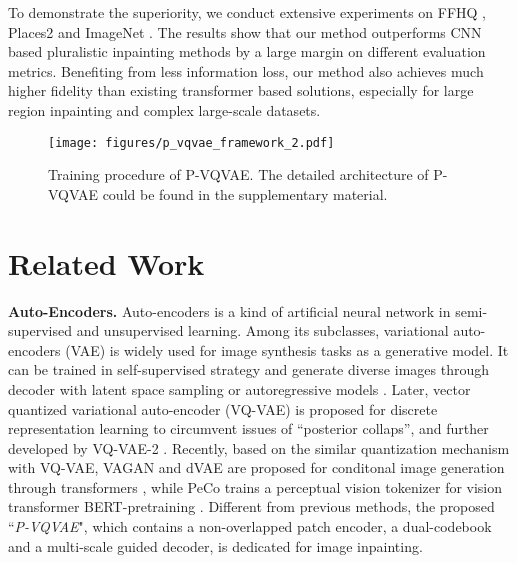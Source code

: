 \documentclass[10pt,twocolumn,letterpaper]{article}
\begin{document}
    To demonstrate the superiority, we conduct extensive experiments on FFHQ \cite{karras2019style}, Places2 \cite{zhou2017places} and ImageNet \cite{deng2009imagenet}. The results show that our method outperforms CNN based pluralistic inpainting methods by a large margin on different evaluation metrics. Benefiting from less information loss, our method also achieves much higher fidelity than existing transformer based solutions, especially for large region inpainting and complex large-scale datasets.


\begin{figure*}[t]
	\centering
	\texttt{[image: figures/p\_vqvae\_framework\_2.pdf]} 
	\caption{Training procedure of P-VQVAE. 
The detailed architecture of P-VQVAE could be found in the supplementary material.
	}
	\vspace{-8pt}
	\label{figure: p_vqvae_framework}
\end{figure*}
    
  
\section{Related Work}
\label{sec:related work}

\noindent\textbf{Auto-Encoders.}
Auto-encoders \cite{hinton1994autoencoders} is a kind of artificial neural network in semi-supervised and unsupervised learning. Among its subclasses, variational auto-encoders (VAE) \cite{kingma2013auto,doersch2016tutorial} is widely used for image synthesis tasks \cite{tan2021efficient,tan2021diverse} as a generative model. 
It can be trained in self-supervised strategy and generate diverse images through decoder with latent space sampling or autoregressive models \cite{van2016pixel,oord2016conditional}. Later, vector quantized variational auto-encoder (VQ-VAE) \cite{van2017neural} is proposed for discrete representation learning to circumvent issues of ``posterior collaps'', and further developed by VQ-VAE-2 \cite{razavi2019generating}. Recently, based on the similar quantization mechanism with VQ-VAE, VAGAN \cite{esser2021taming} and dVAE \cite{ramesh2021zero} are proposed for conditonal image generation through transformers \cite{vaswani2017attention}, while PeCo \cite{dong2021peco} trains a perceptual vision tokenizer for vision transformer BERT-pretraining \cite{wang2022bevt}. Different from previous methods, the proposed ``\textit{P-VQVAE}", which contains a non-overlapped patch encoder, a dual-codebook and a multi-scale guided decoder, is dedicated for image inpainting.
\end{document}
